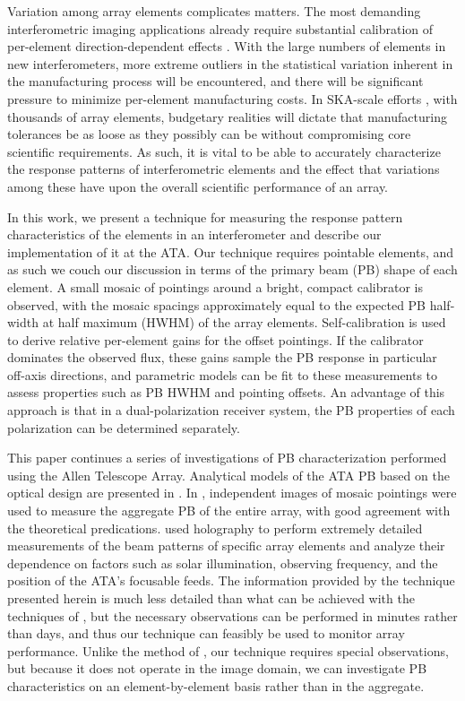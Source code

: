 \documentclass[preprint]{aastex}
\begin{document}
Variation among array elements complicates matters. The most demanding
interferometric imaging applications already require substantial
calibration of per-element direction-dependent effects
\citep{bcgu08,ns10}. With the large numbers of elements in new
interferometers, more extreme outliers in the statistical variation
inherent in the manufacturing process will be encountered, and there
will be significant pressure to minimize per-element manufacturing
costs. In SKA-scale efforts \citep{theska}, with thousands of array
elements, budgetary realities will dictate that manufacturing
tolerances be as loose as they possibly can be without compromising
core scientific requirements. As such, it is vital to be able to
accurately characterize the response patterns of interferometric
elements and the effect that variations among these have upon the
overall scientific performance of an array.

In this work, we present a technique for measuring the response
pattern characteristics of the elements in an interferometer and
describe our implementation of it at the ATA. Our technique requires
pointable elements, and as such we couch our discussion in terms of
the primary beam (PB) shape of each element. A small mosaic of
pointings around a bright, compact calibrator is observed, with the
mosaic spacings approximately equal to the expected PB half-width at
half maximum (HWHM) of the array elements. Self-calibration
\citep{pr84} is used to derive relative per-element gains for the
offset pointings. If the calibrator dominates the observed flux, these
gains sample the PB response in particular off-axis directions, and
parametric models can be fit to these measurements to assess
properties such as PB HWHM and pointing offsets. An advantage of this
approach is that in a dual-polarization receiver system, the PB
properties of each polarization can be determined separately.

This paper continues a series of investigations of PB characterization
performed using the Allen Telescope Array. Analytical models of the
ATA PB based on the optical design are presented in \citet{wd04}. In
\citet{Hull2010}, independent images of mosaic pointings were used to
measure the aggregate PB of the entire array, with good agreement with
the theoretical predications. \citet{Harp2011} used holography to
perform extremely detailed measurements of the beam patterns of
specific array elements and analyze their dependence on factors such
as solar illumination, observing frequency, and the position of the
ATA's focusable feeds. The information provided by the technique
presented herein is much less detailed than what can be achieved with
the techniques of \citet{Harp2011}, but the necessary observations can
be performed in minutes rather than days, and thus our technique can
feasibly be used to monitor array performance. Unlike the method of
\citet{Hull2010}, our technique requires special observations, but
because it does not operate in the image domain, we can investigate PB
characteristics on an element-by-element basis rather than in the
aggregate.
\end{document}
